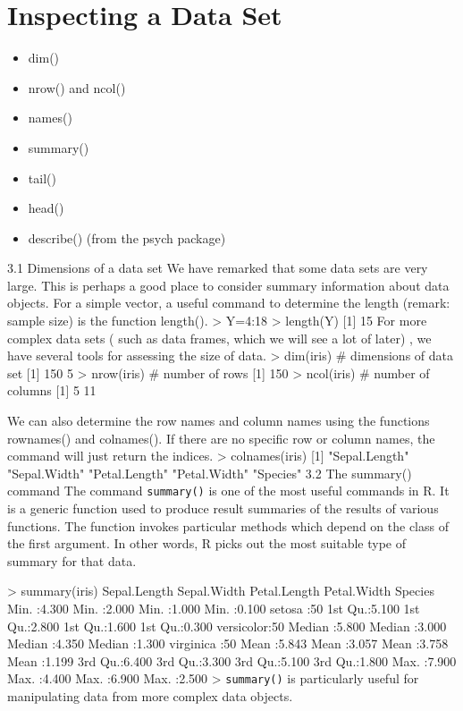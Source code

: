 
\section{Inspecting a Data Set}
\begin{itemize}
	\item dim()
	\item nrow() and ncol()
	\item names()
	\item summary()
	\item tail()
	\item head()
	\item describe() (from the psych package)
\end{itemize}
3.1 Dimensions of a data set
We have remarked that some data sets are very large. This is perhaps a good place to consider
summary information about data objects. For a simple vector, a useful command to determine
the length (remark: sample size) is the function length().
> Y=4:18
> length(Y)
[1] 15
For more complex data sets ( such as data frames,  which we will see a lot of later) , we have several
tools for assessing the size of data.
> dim(iris) # dimensions of data set
[1] 150 5
> nrow(iris) # number of rows
[1] 150
> ncol(iris) # number of columns
[1] 5
11

We can also determine the row names and column names using the functions rownames()
and colnames(). If there are no specific row or column names, the command will just return
the indices.
> colnames(iris)
[1] "Sepal.Length" "Sepal.Width" "Petal.Length" "Petal.Width" "Species"
3.2 The summary() command
The command \texttt{summary()} is one of the most useful commands in R. It is a generic function used
to produce result summaries of the results of various functions. The function invokes particular
methods which depend on the class of the first argument. In other words, R picks out the most
suitable type of summary for that data.

> summary(iris)
Sepal.Length Sepal.Width Petal.Length Petal.Width Species
Min. :4.300 Min. :2.000 Min. :1.000 Min. :0.100 setosa :50
1st Qu.:5.100 1st Qu.:2.800 1st Qu.:1.600 1st Qu.:0.300 versicolor:50
Median :5.800 Median :3.000 Median :4.350 Median :1.300 virginica :50
Mean :5.843 Mean :3.057 Mean :3.758 Mean :1.199
3rd Qu.:6.400 3rd Qu.:3.300 3rd Qu.:5.100 3rd Qu.:1.800
Max. :7.900 Max. :4.400 Max. :6.900 Max. :2.500
>
\texttt{summary()} is particularly useful for manipulating data from more complex data objects.


